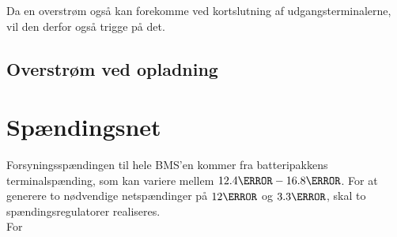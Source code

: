 Da en overstrøm også kan forekomme ved kortslutning af udgangsterminalerne, vil den derfor også trigge på det.

\subsection{Overstrøm ved opladning}

\section{Spændingsnet}
Forsyningsspændingen til hele BMS'en kommer fra batteripakkens terminalspænding, som kan variere mellem $12.4\volt - 16.8\volt$. For at generere to nødvendige netspændinger på $12\volt$ og $3.3\volt$, skal to spændingsregulatorer realiseres.
\\

For 

